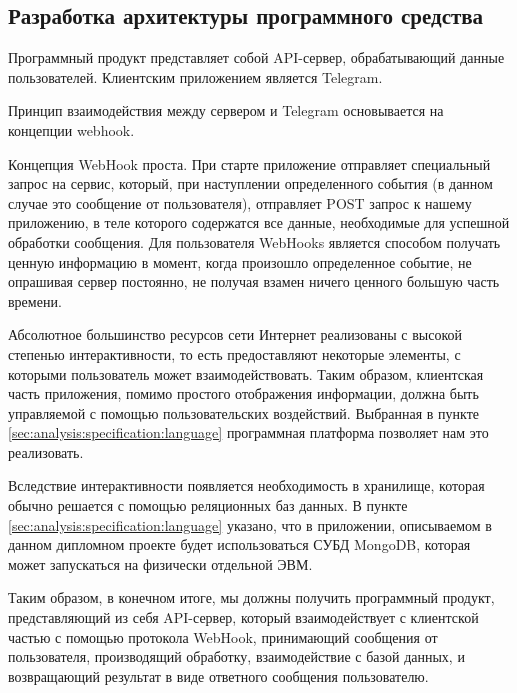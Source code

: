 \subsection{Разработка архитектуры программного средства}
\label{sec:design:architecture}

Программный продукт представляет собой API-сервер, обрабатывающий
данные пользователей. Клиентским приложением является Telegram.

Принцип взаимодействия между сервером и Telegram основывается на концепции webhook.

Концепция WebHook проста. При старте приложение отправляет специальный запрос на сервис, который, при наступлении определенного события (в данном случае это сообщение от пользователя), отправляет POST запрос к нашему приложению, в теле которого содержатся все данные, необходимые для успешной обработки сообщения. Для пользователя WebHooks является способом получать ценную информацию в момент, когда произошло определенное событие, не опрашивая сервер постоянно, не получая взамен ничего ценного большую часть времени. 

Абсолютное большинство ресурсов сети Интернет реализованы с высокой степенью интерактивности, то есть предоставляют некоторые элементы, с которыми пользователь может взаимодействовать. Таким образом, клиентская часть приложения, помимо простого отображения информации, должна быть управляемой с помощью пользовательских воздействий. Выбранная в пункте \ref{sec:analysis:specification:language} программная платформа позволяет нам это реализовать.

Вследствие интерактивности появляется необходимость в хранилище, которая обычно решается с помощью реляционных баз данных. В пункте \ref{sec:analysis:specification:language} указано, что в приложении, описываемом в данном дипломном проекте будет использоваться СУБД MongoDB, которая может запускаться на физически отдельной ЭВМ.

Таким образом, в конечном итоге, мы должны получить программный продукт, представляющий из себя API-сервер, который взаимодействует с клиентской частью с помощью протокола WebHook, принимающий сообщения от пользователя, производящий обработку, взаимодействие с базой данных, и возвращающий результат в виде ответного сообщения пользователю.
